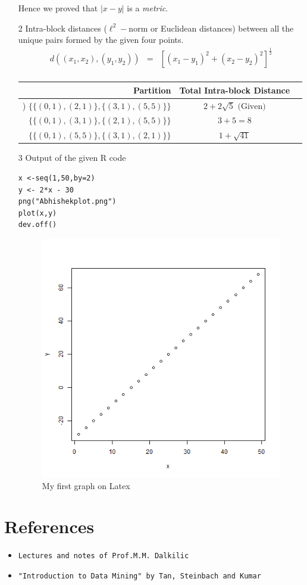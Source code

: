 \documentclass[12pt]{article}
\begin{document}
\begin{enumerate}
Hence we proved that $|x-y|$ is a \textit{metric}. 
\item[2] Intra-block distances ($\ell^2-\mathrm{norm}$ or Euclidean distances) between all the unique pairs formed by the given four points.
\begin{eqnarray*}
d((x_1,x_2),(y_1,y_2)) &=& [(x_1 - y_1)^2 + (x_2 - y_2)^2]^{\frac{1}{2}} \\
\end{eqnarray*}
\newpage
\begin{table}[h]
\centering
\begin{tabular}{r|cc} \hline
\textsf{Partition} & \textsf{Total Intra-block Distance} \\ \hline
\right) $\{\{(0,1),(2,1)\},\{(3,1),(5,5)\}\}$ & $2 + 2\sqrt{5} \text{ (Given)}$\\ \hline
$\{\{(0,1),(3,1)\},\{(2,1),(5,5)\}\}$ & $3 + 5 = 8$ \\ \hline
$\{\{(0,1),(5,5)\},\{(3,1),(2,1)\}\}$ & $1 + \sqrt{41}$ \\ \hline
\end{tabular}
\end{table}
\item[3] Output of the given R code 
\begin{verbatim}
x <-seq(1,50,by=2)
y <- 2*x - 30
png("Abhishekplot.png")
plot(x,y)
dev.off()
\end{verbatim}
\begin{figure}[h]
\includegraphics[width=0.35\columnwidth]{Abhishekplot}\centering
\caption{My first graph on Latex}
\end{figure}
\end{enumerate}
\section*{References}
\begin{itemize}
\item \texttt{Lectures and notes of Prof.M.M. Dalkilic}
\item \texttt{"Introduction to Data Mining" by Tan, Steinbach and Kumar}
\end{itemize}
\end{document}
